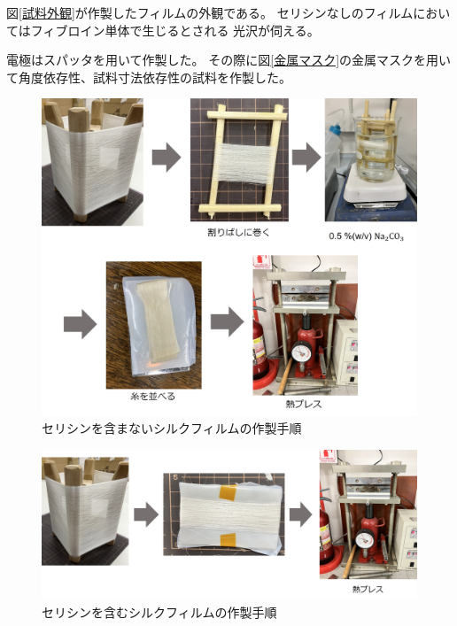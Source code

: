 \documentclass[dvipdfmx,12pt,a4paper]{jreport}
\begin{document}
		図\ref{試料外観}が作製したフィルムの外観である。
		セリシンなしのフィルムにおいてはフィブロイン単体で生じるとされる
		光沢が伺える。

		電極はスパッタを用いて作製した。
		その際に図\ref{金属マスク}の金属マスクを用いて角度依存性、試料寸法依存性の試料を作製した。

		\begin{figure}[h]
			\centering
			\includegraphics[scale=0.65]{試料作製手順.jpg}
			\caption{セリシンを含まないシルクフィルムの作製手順}
			\label{セリシンを含まない試料作製手順}
		\end{figure}
		\newpage
		\begin{figure}[h]
			\centering
			\includegraphics[width=\linewidth]{試料作製手順2.jpg}
			\caption{セリシンを含むシルクフィルムの作製手順}
			\label{セリシンを含むフィルム作製手順}
		\end{figure}
\end{document}
